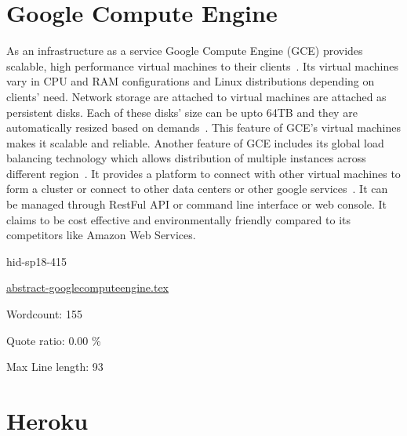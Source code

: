 \section{Google Compute Engine}

As an infrastructure as a service Google Compute Engine (GCE) provides scalable, 
high performance  virtual machines to their clients~\cite{hid-sp18-415-cloud-google}. 
Its virtual machines vary in CPU and RAM configurations  and Linux distributions 
depending on clients’ need. Network storage are attached to virtual machines are 
attached as persistent disks. Each of these disks’ size can be upto 64TB and 
they are automatically resized based on demands~\cite{hid-sp18-415-cloud-google}. 
This feature of GCE’s virtual machines makes it scalable and reliable. Another 
feature of GCE includes its global load balancing technology which allows 
distribution of multiple instances across different region~\cite{hid-sp18-415-cloud-google}. 
It provides a platform to connect with other virtual machines to form a cluster or 
connect to other data centers or other google services~\cite{hid-sp18-415-cloud-google}. 
It can be managed through RestFul API or command line interface or web console. 
It claims to be cost effective and environmentally friendly compared to its 
competitors like Amazon Web Services.


\begin{IU}

hid-sp18-415

\href{https://github.com/cloudmesh-community/hid-sp18-415/blob/master//technology/abstract-googlecomputeengine.tex}{abstract-googlecomputeengine.tex}

 

Wordcount: 155


Quote ratio: 0.00 \%
 
Max Line length: 93
\end{IU}

\section{Heroku}
 
